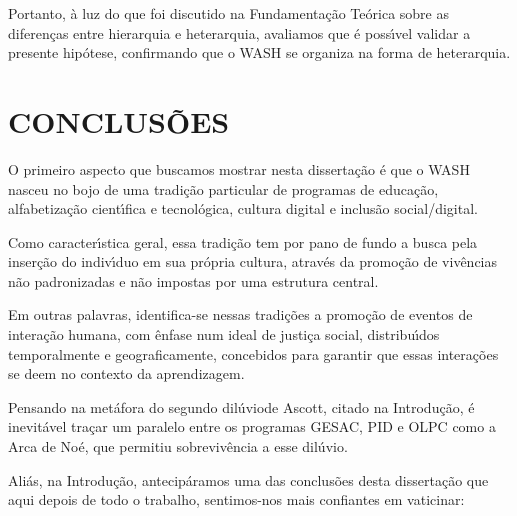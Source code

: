 \documentclass[
12pt,		%
openright,	%
twoside,  %
a4paper,			%
chapter=TITLE,		%
english,			%
french,				%
spanish,			%
brazil				%
]{USPSC-classe/USPSC}
\begin{document}
Portanto, \`a luz do que foi discutido na Fundamenta\c{c}\~ao Te\'orica sobre as diferen\c{c}as entre hierarquia e heterarquia, avaliamos que \'e poss\'{\i}vel validar a presente hip\'otese, confirmando que o WASH se organiza na forma de heterarquia.








\chapter[CONCLUS\~OES]{CONCLUS\~OES}\label{CONCLUS\~OES}
O primeiro aspecto que buscamos mostrar nesta disserta\c{c}\~ao \'e que o WASH nasceu no bojo de uma tradi\c{c}\~ao particular de programas de educa\c{c}\~ao, alfabetiza\c{c}\~ao cient\'{\i}fica e tecnol\'ogica, cultura digital e inclus\~ao social/digital.








Como caracter\'{\i}stica geral, essa tradi\c{c}\~ao tem por pano de fundo a busca pela inser\c{c}\~ao do indiv\'{\i}duo em sua pr\'opria cultura, atrav\'es da promo\c{c}\~ao de viv\^encias n\~ao padronizadas e n\~ao impostas por uma estrutura central.








Em outras palavras, identifica-se nessas tradi\c{c}\~oes a promo\c{c}\~ao de eventos de intera\c{c}\~ao humana, com \^enfase num ideal de justi\c{c}a social, distribu\'{\i}dos temporalmente e geograficamente, concebidos para garantir que essas intera\c{c}\~oes se deem no contexto da aprendizagem.








Pensando na met\'afora do \textquotedbl segundo dil\'uvio\textquotedbl  de Ascott, citado na Introdu\c{c}\~ao, \'e inevit\'avel tra\c{c}ar um paralelo entre os programas GESAC, PID e OLPC como a \textquotedbl Arca de No\'e, que permitiu sobreviv\^encia a esse \textquotedbl dil\'uvio\textquotedbl .








Ali\'as, na Introdu\c{c}\~ao, antecip\'aramos uma das conclus\~oes desta disserta\c{c}\~ao que aqui depois de todo o trabalho,  sentimos-nos mais confiantes em vaticinar:
\end{document}
